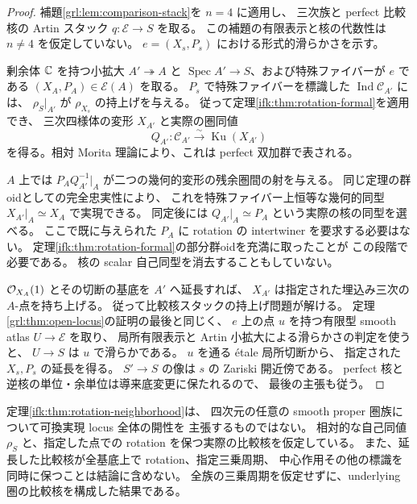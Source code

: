\begin{proof}
補題\ref{grl:lem:comparison-stack}を $n=4$ に適用し、
三次族と perfect 比較核の Artin スタック
$q:\mathcal E\to S$ を取る。
この補題の有限表示と核の代数性は $n\ne4$ を仮定していない。
$e=(X_s,P_s)$ における形式的滑らかさを示す。

剰余体 $\mathbb C$ を持つ小拡大 $A'\twoheadrightarrow A$ と
$\operatorname{Spec}A'\to S$、および特殊ファイバーが $e$ である
$(X_A,P_A)\in\mathcal E(A)$ を取る。
$P_s$ で特殊ファイバーを標識した
$\operatorname{Ind}\mathcal C_{A'}$ には、
$\rho_S|_{A'}$ が $\rho_{X_s}$ の持上げを与える。
従って定理\ref{ifk:thm:rotation-formal}を適用でき、
三次四様体の変形 $X_{A'}$ と実際の圏同値
\[
 Q_{A'}:\mathcal C_{A'}\xrightarrow{\sim}
                         \operatorname{Ku}(X_{A'})
\]
を得る。相対 Morita 理論により、これは perfect 双加群で表される。

$A$ 上では $P_AQ_{A'}^{-1}|_A$ が二つの幾何的変形の残余圏間の射を与える。
同じ定理の群oidとしての完全忠実性により、
これを特殊ファイバー上恒等な幾何的同型
$X_{A'}|_A\simeq X_A$ で実現できる。
同定後には $Q_{A'}|_A\simeq P_A$ という実際の核の同型を選べる。
ここで既に与えられた $P_A$ に rotation の intertwiner を要求する必要はない。
定理\ref{ifk:thm:rotation-formal}の部分群oidを充満に取ったことが
この段階で必要である。
核の scalar 自己同型を消去することもしていない。

$\mathcal O_{X_A}(1)$ とその切断の基底を $A'$ へ延長すれば、
$X_{A'}$ は指定された埋込み三次の $A$-点を持ち上げる。
従って比較核スタックの持上げ問題が解ける。
定理\ref{grl:thm:open-locus}の証明の最後と同じく、
$e$ 上の点 $u$ を持つ有限型 smooth atlas $U\to\mathcal E$ を取り、
局所有限表示と Artin 小拡大による滑らかさの判定を使うと、
$U\to S$ は $u$ で滑らかである。
$u$ を通る \'etale 局所切断から、
指定された $X_s,P_s$ の延長を得る。
$S'\to S$ の像は $s$ の Zariski 開近傍である。
perfect 核と逆核の単位・余単位は導来底変更に保たれるので、
最後の主張も従う。
\end{proof}

\begin{remark}[この局所定理の仮定と結論]
\label{ifk:rem:neighborhood-scope}
定理\ref{ifk:thm:rotation-neighborhood}は、
四次元の任意の smooth proper 圏族について可換実現 locus 全体の開性を
主張するものではない。
相対的な自己同値 $\rho_S$ と、指定した点での
rotation を保つ実際の比較核を仮定している。
また、延長した比較核が全基底上で rotation、指定三乗周期、
中心作用その他の標識を同時に保つことは結論に含めない。
全族の三乗周期を仮定せずに、underlying 圏の比較核を構成した結果である。
\end{remark}

